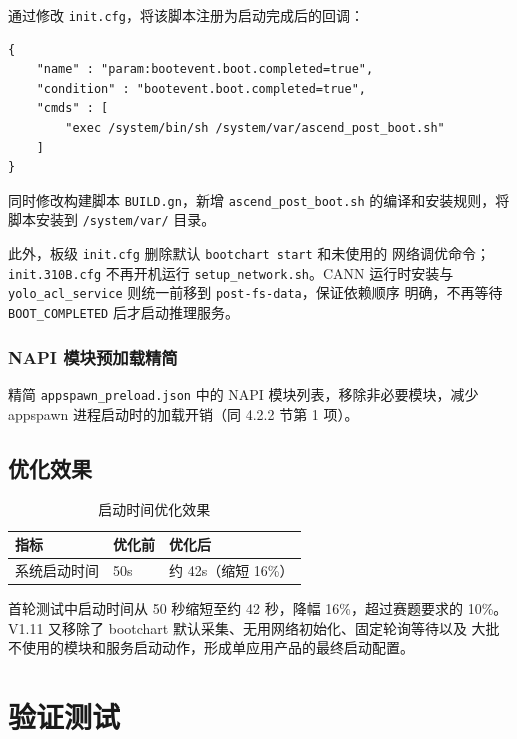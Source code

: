 通过修改 \texttt{init.cfg}，将该脚本注册为启动完成后的回调：

\begin{lstlisting}[caption={init.cfg 注册 post\_boot 回调}]
{
    "name" : "param:bootevent.boot.completed=true",
    "condition" : "bootevent.boot.completed=true",
    "cmds" : [
        "exec /system/bin/sh /system/var/ascend_post_boot.sh"
    ]
}
\end{lstlisting}

同时修改构建脚本 \texttt{BUILD.gn}，新增 \texttt{ascend\_post\_boot.sh} 的编译和安装规则，将脚本安装到 \texttt{/system/var/} 目录。

此外，板级 \texttt{init.cfg} 删除默认 \texttt{bootchart start} 和未使用的
网络调优命令；\texttt{init.310B.cfg} 不再开机运行
\texttt{setup\_network.sh}。CANN 运行时安装与
\texttt{yolo\_acl\_service} 则统一前移到 \texttt{post-fs-data}，保证依赖顺序
明确，不再等待 \texttt{BOOT\_COMPLETED} 后才启动推理服务。

\subsubsection{NAPI 模块预加载精简}

精简 \texttt{appspawn\_preload.json} 中的 NAPI 模块列表，移除非必要模块，减少 appspawn 进程启动时的加载开销（同 4.2.2 节第 1 项）。

\subsection{优化效果}

\begin{table}[htbp]
  \centering
  \caption{启动时间优化效果}
  \label{tab:boot-time-optimization}
  \begin{tabular}{lll}
    \toprule
    指标 & 优化前 & 优化后 \\
    \midrule
    系统启动时间 & 50s & 约 42s（缩短 16\%） \\
    \bottomrule
  \end{tabular}
\end{table}

首轮测试中启动时间从 50 秒缩短至约 42 秒，降幅 16\%，超过赛题要求的
10\%。V1.11 又移除了 bootchart 默认采集、无用网络初始化、固定轮询等待以及
大批不使用的模块和服务启动动作，形成单应用产品的最终启动配置。


\section{验证测试}

